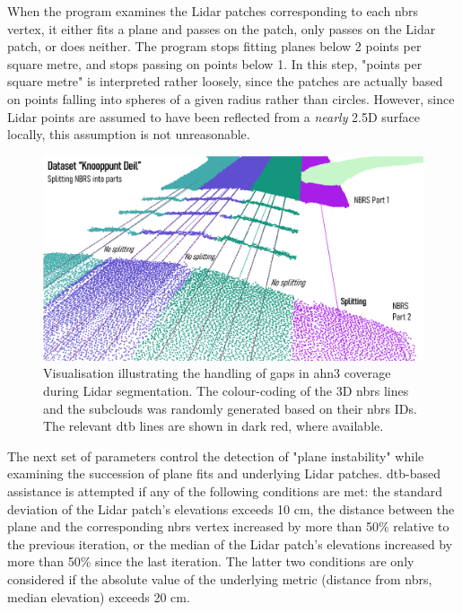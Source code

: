 When the program examines the Lidar patches corresponding to each \ac{nbrs} vertex, it either fits a plane and passes on the patch, only passes on the Lidar patch, or does neither. The program stops fitting planes below 2 points per square metre, and stops passing on points below 1. In this step, "points per square metre" is interpreted rather loosely, since the patches are actually based on points falling into spheres of a given radius rather than circles. However, since Lidar points are assumed to have been reflected from a \textit{nearly} 2.5D surface locally, this assumption is not unreasonable.

\begin{figure}
    \centering
    \includegraphics[width=0.92\linewidth]{final_report/figs/lidarsegmentation2.png}
    \caption[Render illustrating the handling of AHN3 gaps during Lidar segmentation]{Visualisation illustrating the handling of gaps in \ac{ahn3} coverage during Lidar segmentation. The colour-coding of the 3D \ac{nbrs} lines and the subclouds was randomly generated based on their \ac{nbrs} IDs. The relevant \ac{dtb} lines are shown in dark red, where available.}
    \label{fig:lidarsegmentation2}
\end{figure}

The next set of parameters control the detection of "plane instability" while examining the succession of plane fits and underlying Lidar patches. \ac{dtb}-based assistance is attempted if any of the following conditions are met: the standard deviation of the Lidar patch's elevations exceeds 10 cm, the distance between the plane and the corresponding \ac{nbrs} vertex increased by more than 50\% relative to the previous iteration, or the median of the Lidar patch's elevations increased by more than 50\% since the last iteration. The latter two conditions are only considered if the absolute value of the underlying metric (distance from \ac{nbrs}, median elevation) exceeds 20 cm.

